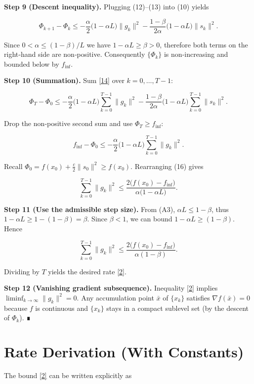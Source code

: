 \documentclass{article}
\begin{document}
\noindent\textbf{Step 9 (Descent inequality).}  
Plugging (12)–(13) into (10) yields

\[
\Phi_{k+1}-\Phi_{k}
\le -\frac{\alpha}{2}\bigl(1-\alpha L\bigr)\|g_{k}\|^{2}
   -\frac{1-\beta}{2\alpha}\bigl(1-\alpha L\bigr)\|s_{k}\|^{2}. \tag{14}
\]

Since $0<\alpha\le (1-\beta)/L$ we have $1-\alpha L\ge\beta>0$, therefore both terms on the right‑hand side are non‑positive. Consequently $\{\Phi_{k}\}$ is non‑increasing and bounded below by $f_{\inf}$.

\noindent\textbf{Step 10 (Summation).}  
Sum \eqref{14} over $k=0,\dots,T-1$:

\[
\Phi_{T}-\Phi_{0}
\le -\frac{\alpha}{2}\bigl(1-\alpha L\bigr)\sum_{k=0}^{T-1}\|g_{k}\|^{2}
   -\frac{1-\beta}{2\alpha}\bigl(1-\alpha L\bigr)\sum_{k=0}^{T-1}\|s_{k}\|^{2}. \tag{15}
\]

Drop the non‑positive second sum and use $\Phi_{T}\ge f_{\inf}$:

\[
f_{\inf}-\Phi_{0}
\le -\frac{\alpha}{2}\bigl(1-\alpha L\bigr)\sum_{k=0}^{T-1}\|g_{k}\|^{2}. \tag{16}
\]

Recall $\Phi_{0}=f(x_{0})+\frac{c}{2}\|s_{0}\|^{2}\ge f(x_{0})$. Rearranging (16) gives

\[
\sum_{k=0}^{T-1}\|g_{k}\|^{2}
\le \frac{2\bigl(f(x_{0})-f_{\inf}\bigr)}{\alpha\bigl(1-\alpha L\bigr)}. \tag{17}
\]

\noindent\textbf{Step 11 (Use the admissible step size).}  
From (A3), $\alpha L\le 1-\beta$, thus $1-\alpha L\ge 1-(1-\beta)=\beta$. Since $\beta<1$, we can bound $1-\alpha L\ge (1-\beta)$. Hence

\[
\sum_{k=0}^{T-1}\|g_{k}\|^{2}
\le \frac{2\bigl(f(x_{0})-f_{\inf}\bigr)}{\alpha(1-\beta)}. \tag{18}
\]

Dividing by $T$ yields the desired rate \eqref{2}.

\noindent\textbf{Step 12 (Vanishing gradient subsequence).}  
Inequality \eqref{2} implies $\displaystyle\liminf_{k\to\infty}\|g_{k}\|^{2}=0$. Any accumulation point $\bar{x}$ of $\{x_{k}\}$ satisfies $\nabla f(\bar{x})=0$ because $f$ is continuous and $\{x_{k}\}$ stays in a compact sublevel set (by the descent of $\Phi_{k}$). ∎

\section*{Rate Derivation (With Constants)}
The bound \eqref{2} can be written explicitly as  
\end{document}
